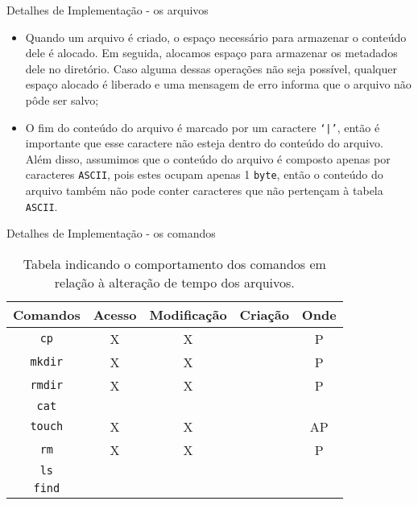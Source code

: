 \documentclass[10pt]{beamer}
\begin{document}
    \begin{frame}{Detalhes de Implementação - os arquivos}
        \begin{itemize}
            \justifying
            \item Quando um arquivo é criado, o espaço necessário para armazenar
                o conteúdo dele é alocado. Em seguida, alocamos espaço para
                armazenar os metadados dele no diretório. Caso alguma dessas
                operações não seja possível, qualquer espaço alocado é liberado
                e uma mensagem de erro informa que o arquivo não pôde ser
                salvo;
            \item O fim do conteúdo do arquivo é marcado por um caractere
                \texttt{`|'}, então é importante que esse caractere não esteja
                dentro do conteúdo do arquivo. Além disso, assumimos que o
                conteúdo do arquivo é composto apenas por caracteres
                \texttt{ASCII}, pois estes ocupam apenas 1 \texttt{byte}, então
                o conteúdo do arquivo também não pode conter caracteres que não
                pertençam à tabela \texttt{ASCII}.
        \end{itemize}
    \end{frame}

    \begin{frame}{Detalhes de Implementação - os comandos}
        \centering
        \begin{table}
            \begin{tabular}{|c|c|c|c|c|}
                \hline
                Comandos & Acesso & Modificação & Criação & Onde \\
                \hline
                \texttt{cp} & X & X & & P \\
                \hline
                \texttt{mkdir} & X & X & & P \\
                \hline
                \texttt{rmdir} & X & X & & P \\
                \hline
                \texttt{cat} &  &  & &  \\
                \hline
                \texttt{touch} & X & X & & AP \\
                \hline
                \texttt{rm} & X & X & & P \\
                \hline
                \texttt{ls} &  &  & &  \\
                \hline
                \texttt{find} &  &  & &  \\
                \hline
            \end{tabular}
            \caption{Tabela indicando o comportamento dos comandos em relação à
            alteração de tempo dos arquivos.} \label{tabela}
        \end{table}
    \end{frame}
\end{document}
